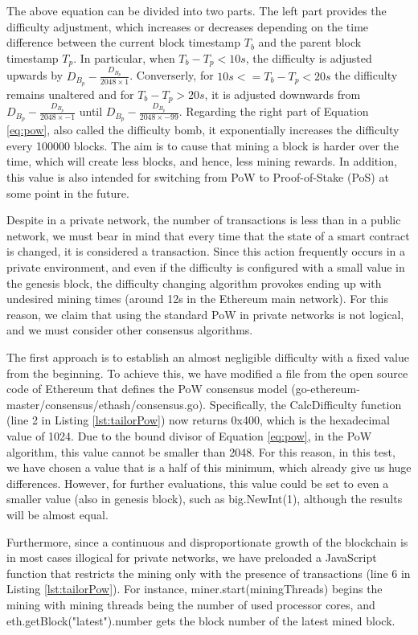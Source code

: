 The above equation can be divided into two parts. The left part provides the difficulty adjustment, which increases or decreases depending on the time difference between the current block timestamp $T_b$ and the parent block timestamp $T_p$. In particular, when $T_b - T_p < 10s$, the difficulty is adjusted upwards by $D_{B_p} - \frac{D_{B_p}}{2048 \times 1}$. Converserly, for $10s <= T_b - T_p < 20s$ the difficulty remains unaltered and for $T_b - T_p > 20s$, it is adjusted downwards from $D_{B_p} - \frac{D_{B_p}}{2048 \times -1}$ until $D_{B_p} - \frac{D_{B_p}}{2048 \times -99}$. Regarding the right part of Equation \ref{eq:pow}, also called the difficulty bomb, it exponentially increases the difficulty every 100000 blocks. The aim is to cause that mining a block is harder over the time, which will create less blocks, and hence, less mining rewards. In addition, this value is also intended for switching from PoW to Proof-of-Stake (PoS) at some point in the future.

Despite in a private network, the number of transactions is less than in a public network, we must bear in mind that every time that the state of a smart contract is changed, it is considered a transaction. Since this action frequently occurs in a private environment, and even if the difficulty is configured with a small value in the genesis block, the difficulty changing algorithm provokes ending up with undesired mining times (around 12s in the Ethereum main network). For this reason, we claim that using the standard PoW in private networks is not logical, and we must consider other consensus algorithms.

The first approach is to establish an almost negligible difficulty with a fixed value from the beginning. To achieve this, we have modified a file from the open source code of Ethereum that defines the PoW consensus model (go-ethereum-master/consensus/ethash/consensus.go). Specifically, the CalcDifficulty function (line 2 in Listing \ref{lst:tailorPow}) now returns 0x400, which is the hexadecimal value of 1024. Due to the bound divisor of Equation \ref{eq:pow}, in the PoW algorithm, this value cannot be smaller than 2048. For this reason, in this test, we have chosen a value that is a half of this minimum, which already give us huge differences. However, for further evaluations, this value could be set to even a smaller value (also in genesis block), such as big.NewInt(1), although the results will be almost equal.

Furthermore, since a continuous and disproportionate growth of the blockchain is in most cases illogical for private networks, we have preloaded a JavaScript function that restricts the mining only with the presence of transactions (line 6 in Listing \ref{lst:tailorPow}). For instance, miner.start(miningThreads) begins the mining with mining threads being the number of used processor cores, and eth.getBlock("latest").number gets the block number of the latest mined block.
\newline

